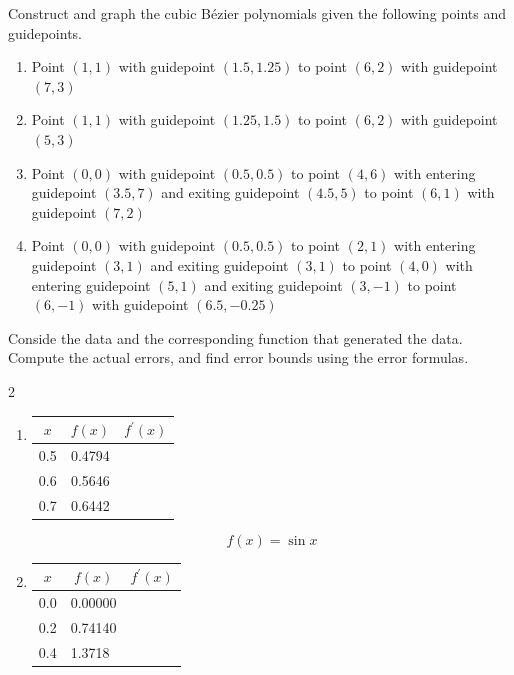 \begin{posttest}%
\item Construct and graph the cubic Bézier polynomials given the following points and guidepoints.
\begin{enumerate}[label=(\alph*)]
\item Point $(1,1)$ with guidepoint $(1.5,1.25)$ to point $(6,2)$ with guidepoint $(7,3)$\\
\item Point $(1,1)$ with guidepoint $(1.25,1.5)$ to point $(6,2)$ with guidepoint $(5,3)$\\
\item Point $(0,0)$ with guidepoint $(0.5,0.5)$ to point $(4,6)$ with entering guidepoint $(3.5,7)$ and exiting guidepoint $(4.5,5)$ to point $(6,1)$ with guidepoint $(7,2)$\\
\item Point $(0,0)$ with guidepoint $(0.5,0.5)$ to point $(2,1)$ with entering guidepoint $(3,1)$ and exiting guidepoint $(3,1)$ to point $(4,0)$ with entering guidepoint $(5,1)$ and exiting guidepoint $(3,-1)$ to point $(6,-1)$ with guidepoint $(6.5,-0.25)$ 
\end{enumerate}

\item Conside the data and the corresponding function that generated the data. Compute the actual errors, and find error bounds using the error formulas.

\begin{multicols}{2}
\begin{enumerate}[label=(\alph*)]
\item
\begin{center}
\begin{tabular}{c|c|l}
$x$ & $f(x)$ & $f^{\prime}(x)$ \\
\hline
0.5 & 0.4794 &  \\
0.6 & 0.5646 &  \\
0.7 & 0.6442 &  \\
\end{tabular}
\end{center}

\[f(x)=\sin x\]
\item
\begin{center}
\begin{tabular}{c|l|l}
$x$ & \multicolumn{1}{|c|}{$f(x)$} & $f^{\prime}(x)$ \\
\hline
0.0 & 0.00000 &  \\
0.2 & 0.74140 &  \\
0.4 & 1.3718 &  \\
\end{tabular}
\end{center}


\end{enumerate}
\end{multicols}
\end{posttest}
